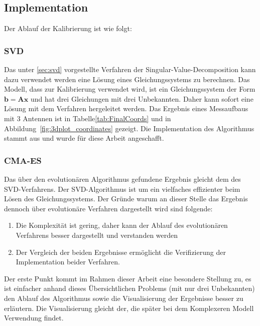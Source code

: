 \subsection{Implementation}
%
Der Ablauf der Kalibrierung ist wie folgt:


\subsubsection{SVD}
%
Das unter \ref{sec:svd} vorgestellte Verfahren der Singular-Value-Decomposition kann dazu verwendet werden eine Lösung eines Gleichungssystems zu berechnen. Das Modell, dass zur Kalibrierung verwendet wird, ist ein Gleichungssystem der Form $\mathbf{b}=\mathbf{A}\mathbf{x}$ und hat drei Gleichungen mit drei Unbekannten. Daher kann sofort eine Lösung mit dem Verfahren hergeleitet werden. Das Ergebnis eines Messaufbaus mit 3 Antennen ist in Tabelle\ref{tab:FinalCoords} und in Abbildung~\ref{fig:3dplot_coordinates} gezeigt. Die Implementation des Algorithmus stammt aus \cite{press2007numerical} und wurde für diese Arbeit angeschafft.
%
\subsubsection{CMA-ES}
Das über den evolutionären Algorithmus gefundene Ergebnis gleicht dem des SVD-Verfahrens. Der SVD-Algorithmus ist um ein vielfaches effizienter beim Lösen des Gleichungssystems. Der Gründe warum an dieser Stelle das Ergebnis dennoch über evolutionäre Verfahren dargestellt wird sind folgende:
%
\begin{enumerate}
 \item Die Komplexität ist gering, daher kann der Ablauf des evolutionären Verfahrens besser dargestellt und verstanden werden
 \item Der Vergleich der beiden Ergebnisse ermöglicht die Verifizierung der Implementation beider Verfahren.
\end{enumerate}
%
Der erste Punkt kommt im Rahmen dieser Arbeit eine besondere Stellung zu, es ist einfacher anhand dieses Übersichtlichen Problems (mit nur drei Unbekannten) den Ablauf des Algorithmus sowie die Visualisierung der Ergebnisse besser zu erläutern. Die Visualisierung gleicht der, die später bei dem Komplexeren Modell Verwendung findet.
%
